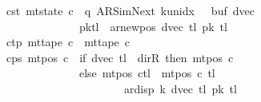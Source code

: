 \begin{isabellebody}
\ \ \ \ \ c{}{\isacharunderscore}{\kern0pt}st{\isacharcolon}{\kern0pt}\ {\isachardoublequoteopen}mt{\isacharunderscore}{\kern0pt}state\ c{}\ {\isacharequal}{\kern0pt}\ {\isacharparenleft}{\kern0pt}q{\isacharcomma}{\kern0pt}\ AR{\isacharunderscore}{\kern0pt}SimNext{\isacharcomma}{\kern0pt}\ k{\isacharunderscore}{\kern0pt}unidx\ {}{\isacharcomma}{\kern0pt}\ {}{\isacharcomma}{\kern0pt}\ buf{}{\isacharcomma}{\kern0pt}\ dvec{\isacharcomma}{\kern0pt}\isanewline
\ \ \ \ \ \ \ \ \ \ \ \ \ \ \ \ \ \ {\isacharquery}{\kern0pt}pk{\isacharparenleft}{\kern0pt}{\isacharquery}{\kern0pt}tl\ {\isacharcolon}{\kern0pt}{\isacharequal}{\kern0pt}\ ar{\isacharunderscore}{\kern0pt}newpos\ {\isacharparenleft}{\kern0pt}dvec\ {\isacharquery}{\kern0pt}tl{\isacharparenright}{\kern0pt}\ {\isacharparenleft}{\kern0pt}{\isacharquery}{\kern0pt}pk\ {\isacharquery}{\kern0pt}tl{\isacharparenright}{\kern0pt}{\isacharparenright}{\kern0pt}{\isacharparenright}{\kern0pt}{\isachardoublequoteclose}\isanewline
\ \ \ \ \ c{}{\isacharunderscore}{\kern0pt}tp{\isacharcolon}{\kern0pt}\ {\isachardoublequoteopen}mt{\isacharunderscore}{\kern0pt}tape\ c{}\ {\isacharequal}{\kern0pt}\ mt{\isacharunderscore}{\kern0pt}tape\ c{}{\isachardoublequoteclose}\isanewline
\ \ \ \ \ c{}{\isacharunderscore}{\kern0pt}ps{\isacharcolon}{\kern0pt}\ {\isachardoublequoteopen}mt{\isacharunderscore}{\kern0pt}pos\ c{}\ {\isacharequal}{\kern0pt}\ {\isacharparenleft}{\kern0pt}if\ dvec\ {\isacharquery}{\kern0pt}tl\ {\isacharequal}{\kern0pt}\ dir{\isachardot}{\kern0pt}R\ then\ mt{\isacharunderscore}{\kern0pt}pos\ c{}\isanewline
\ \ \ \ \ \ \ \ \ \ \ \ \ \ \ \ \ \ else\ {\isacharparenleft}{\kern0pt}mt{\isacharunderscore}{\kern0pt}pos\ c{}{\isacharparenright}{\kern0pt}{\isacharparenleft}{\kern0pt}{\isacharquery}{\kern0pt}tl\ {\isacharcolon}{\kern0pt}{\isacharequal}{\kern0pt}\ mt{\isacharunderscore}{\kern0pt}pos\ c{}\ {\isacharquery}{\kern0pt}tl\isanewline
\ \ \ \ \ \ \ \ \ \ \ \ \ \ \ \ \ \ \ \ \ \ \ \ \ {\isacharminus}{\kern0pt}\ ar{\isacharunderscore}{\kern0pt}disp\ {\isacharquery}{\kern0pt}k\ {\isacharparenleft}{\kern0pt}dvec\ {\isacharquery}{\kern0pt}tl{\isacharparenright}{\kern0pt}\ {\isacharparenleft}{\kern0pt}{\isacharquery}{\kern0pt}pk\ {\isacharquery}{\kern0pt}tl{\isacharparenright}{\kern0pt}{\isacharparenright}{\kern0pt}{\isacharparenright}{\kern0pt}{\isachardoublequoteclose}\isanewline
\ \ \ \ \isamarkupfalse%

\end{isabellebody}
